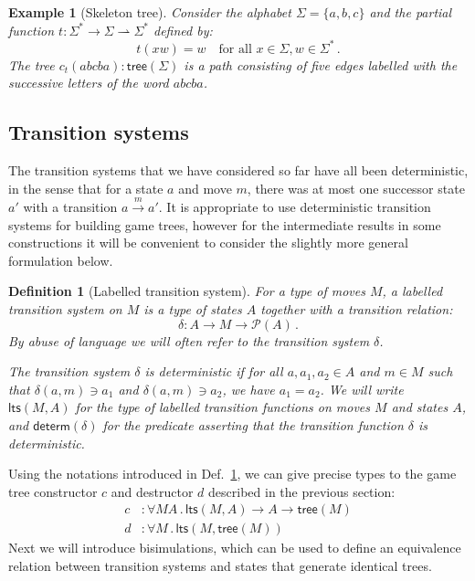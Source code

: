 \documentclass[11pt]{article}
\newcommand{\kw}[1]{{\mathsf{#1}}}
\newtheorem{definition}{Definition}
\newtheorem{example}{Example}
\begin{document}
\begin{example}[Skeleton tree]
Consider the alphabet $\Sigma = \{ a, b, c \}$
and the partial function
$t : \Sigma^* \rightarrow \Sigma \rightharpoonup \Sigma^*$ defined by:
\[
    t(x w) = w \quad \mbox{for all } x \in \Sigma, w \in \Sigma^* \,.
\]
The tree $c_t(abcba) : \kw{tree}(\Sigma)$ is a path
consisting of five edges labelled with the successive letters
of the word $abcba$.
\end{example}

\subsection{Transition systems}

The transition systems that we have considered so far
have all been deterministic,
in the sense that for a state $a$ and move $m$,
there was at most one successor state $a'$
with a transition $a \stackrel{m}{\rightarrow} a'$.
It is appropriate to use deterministic transition systems
for building game trees,
however for the intermediate results in some constructions
it will be convenient to consider
the slightly more general formulation below.

\begin{definition}[Labelled transition system] \label{def:lts}
For a type of moves $M$,
a \emph{labelled transition system} on $M$
is a type of states $A$
together with a transition relation:
\[ \delta : A \rightarrow M \rightarrow \mathcal{P}(A) \,. \]
By abuse of language we will often refer to
\emph{the transition system $\delta$}.

The transition system $\delta$ is \emph{deterministic}
if for all $a, a_1, a_2 \in A$ and $m \in M$
such that $\delta(a, m) \ni a_1$ and $\delta(a, m) \ni a_2$,
we have $a_1 = a_2$.
We will write $\kw{lts}(M, A)$ for the type of
labelled transition functions on moves $M$ and states $A$,
and $\kw{determ}(\delta)$ for the predicate asserting that
the transition function $\delta$ is deterministic.
\end{definition}

Using the notations introduced in Def.~\ref{def:lts},
we can give precise types to the game tree constructor $c$
and destructor $d$ described in the previous section:
\begin{align*}
  c &: \forall M A \, . \, \kw{lts}(M, A) \rightarrow A \rightarrow \kw{tree}(M) \\
  d &: \forall M \, . \, \kw{lts}(M, \kw{tree}(M))
\end{align*}
Next we will introduce bisimulations,
which can be used to define an equivalence relation
between transition systems and states
that generate identical trees.
\end{document}
